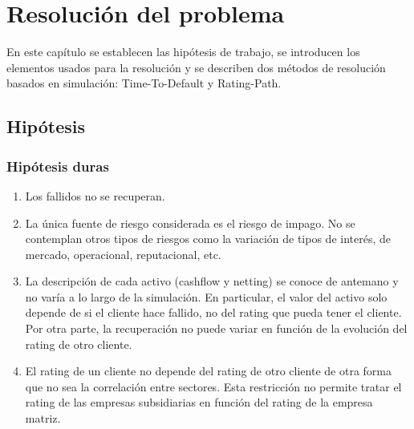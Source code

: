 
%
%
%
%
%
%
%
%

\chapter{Resoluci\'on del problema}
\label{sec:resolution}

En este cap\'itulo se establecen las hip\'otesis de trabajo, se introducen los
elementos usados para la resoluci\'on y se describen dos m\'etodos de
resoluci\'on basados en simulaci\'on: Time-To-Default y Rating-Path.


\section{Hip\'otesis}

\subsection{Hip\'otesis duras}
\begin{enumerate}
\item Los fallidos no se recuperan.
\item La \'unica fuente de riesgo considerada es el riesgo de impago. No se 
contemplan otros tipos de riesgos como la variaci\'on de tipos de inter\'es, 
de mercado, operacional, reputacional, etc.
\item La descripci\'on de cada activo (cashflow y netting) se conoce de antemano
y no var\'ia a lo largo de la simulaci\'on. En particular, el valor del activo solo
depende de si el cliente hace fallido, no del rating que pueda tener el cliente.
Por otra parte, la recuperaci\'on no puede variar en funci\'on de la evoluci\'on
del rating de otro cliente.
\item El rating de un cliente no depende del rating de otro cliente de otra
forma que no sea la correlaci\'on entre sectores. Esta restricci\'on no 
permite tratar el rating de las empresas subsidiarias en funci\'on del rating 
de la empresa matriz.
\end{enumerate}

